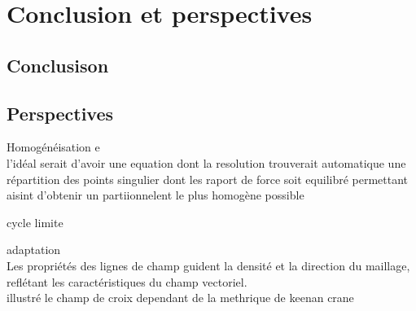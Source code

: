 \chapter{Conclusion et perspectives}
\label{chap:conclusion}

\section*{Conclusison}

\section*{Perspectives}

Homogénéisation e\\
l'idéal serait d'avoir une equation dont la resolution trouverait automatique une répartition des points singulier dont les raport de force soit equilibré permettant aisint d'obtenir un partiionnelent le plus homogène possible
\[\]

cycle limite\\
\[\]

adaptation\\
       Les propriétés des lignes de champ guident la densité et la direction du maillage, reflétant les caractéristiques du champ vectoriel.\\
       illustré le champ de croix dependant de la methrique de keenan crane
\[\]

